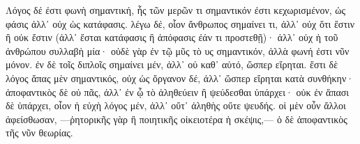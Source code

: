 \startlanguage[grc]
Λόγος δέ ἐστι φωνὴ σημαντική, ἧς τῶν μερῶν τι σημαντικόν ἐστι
κεχωρισμένον, ὡς φάσις ἀλλ᾽ οὐχ ὡς κατάφασις. λέγω δέ, οἷον ἄνθρωπος
σημαίνει τι, ἀλλ᾽ οὐχ ὅτι ἔστιν ἢ οὐκ ἔστιν (ἀλλ᾽ ἔσται κατάφασις ἢ
ἀπόφασις ἐάν τι προστεθῇ)· ἀλλ᾽ οὐχ ἡ τοῦ ἀνθρώπου συλλαβὴ μία· οὐδὲ
γὰρ ἐν τῷ μῦς τὸ υς σημαντικόν, ἀλλὰ φωνή ἐστι νῦν μόνον. ἐν δὲ τοῖς
διπλοῖς σημαίνει μέν, ἀλλ᾽ οὐ καθ᾽ αὑτό, ὥσπερ εἴρηται. ἔστι δὲ λόγος
ἅπας μὲν σημαντικός, οὐχ ὡς ὄργανον δέ, ἀλλ᾽ ὥσπερ εἴρηται κατὰ
συνθήκην· ἀποφαντικὸς δὲ οὐ πᾶς, ἀλλ᾽ ἐν ᾧ τὸ ἀληθεύειν ἢ ψεύδεσθαι
ὑπάρχει· οὐκ ἐν ἅπασι δὲ ὑπάρχει, οἷον ἡ εὐχὴ λόγος μέν, ἀλλ᾽ οὔτ᾽
ἀληθὴς οὔτε ψευδής. οἱ μὲν οὖν ἄλλοι ἀφείσθωσαν, —ῥητορικῆς γὰρ ἢ
ποιητικῆς οἰκειοτέρα ἡ σκέψις,— ὁ δὲ ἀποφαντικὸς τῆς νῦν θεωρίας.
\stoplanguage
